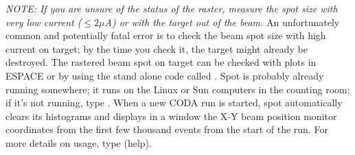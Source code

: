 {\it NOTE:  If you are unsure of the status of the raster,
measure the spot size with very low current ($\le 2 \mu$A) or with
the target out of the beam.}  An unfortunately common and 
potentially fatal error 
is to check the beam spot size with high current on target; by
the time you check it, the target might already be destroyed.
The rastered beam spot on target can be checked with
plots in ESPACE or by using the stand alone code called .
Spot is probably already running somewhere; it runs on the 
Linux or Sun computers in the counting room; if it's not
running, type .  When a new CODA run is started,
spot automatically clears its histograms and displays 
in a window the X-Y beam position monitor
coordinates from the first few thousand events from the
start of the run.  
For more details on usage, type  (help).


%
%
%
%
%
